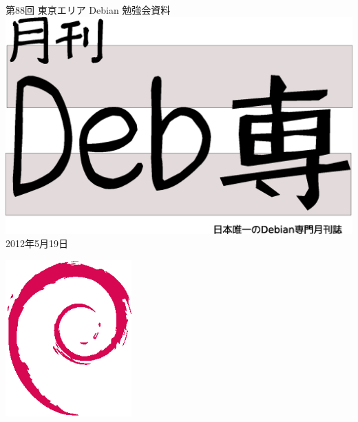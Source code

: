 \documentclass[mingoth,a4paper]{jsarticle}
\newcommand{\debmtgyear}{2012}
\newcommand{\debmtgmonth}{5}
\newcommand{\debmtgdate}{19}
\newcommand{\debmtgnumber}{88}
\begin{document}
\begin{titlepage}
\thispagestyle{empty}

\vspace*{-2cm}
第\debmtgnumber{}回 東京エリア Debian 勉強会資料\\
\hspace*{-2cm}
\includegraphics[width=210mm]{image201003/debsen.eps}\\
\hfill{}\debmtgyear{}年\debmtgmonth{}月\debmtgdate{}日


\vspace*{-2cm}
\hfill{}\includegraphics[height=6cm]{image200502/openlogo-nd.eps}
\end{titlepage}

\end{document}
